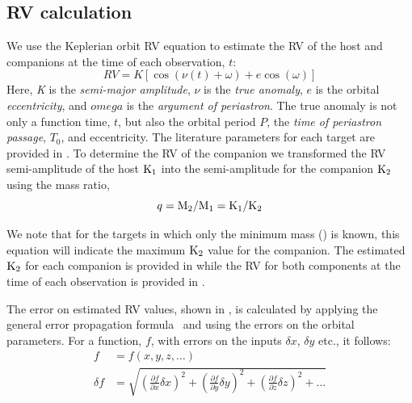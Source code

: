 \subsection{{RV} calculation}
We use the Keplerian orbit {RV} equation to estimate the {RV} of the host and companions at the time of each observation, \(t\):
\begin{equation}
\label{eq:rv_equation}
{RV} = K [\cos{(\nu(t) + \omega)} + e\cos{(\omega)}]
\end{equation}
Here, \emph{K} is the \emph{semi-major amplitude}, \(\nu\) is the \emph{true anomaly}, \(e\) is the orbital \emph{eccentricity}, and \(omega\) is the \emph{argument of periastron}.
The true anomaly is not only a function time, \(t\), but also the orbital period \(P\), the \emph{time of periastron passage}, \(T_0\), and eccentricity.
The literature parameters for each target are provided in .
To determine the {RV} of the companion we transformed the {RV} semi-amplitude of the host \(\textrm{K}_{1}\) into the semi-amplitude for the companion \(\textrm{K}_{2}\) using the mass ratio,
\begin{equation}
\label{eqn:mass_ratio}
q = \textrm{M}_{2} / \textrm{M}_{1} = \textrm{K}_{1} / \textrm{K}_{2}
\end{equation}

We note that for the targets in which only the minimum mass (\mtwosini) is known, this equation will indicate the maximum \(\textrm{K}_{2}\) value for the companion. The estimated \(\textrm{K}_{2}\) for each companion is provided in  while the {RV} for both components at the time of each observation is provided in .


The error on estimated {RV} values, shown in , is calculated by applying the general error propagation formula~\citep{ku_notes_1966} and using the errors on the orbital parameters. For a function, \(f\), with errors on the inputs \(\delta x\), \(\delta y\) etc., it follows:
\begin{align}
f &= f(x, y, z, \ldots)\\
\delta f &= \sqrt{{\left( \frac{\partial f}{\partial x} \delta x\right)}^2 + {\left(\frac{\partial f}{\partial y} \delta y\right)}^2 + {\left(\frac{\partial f}{\partial z} \delta z\right)}^2 + \ldots}
\end{align}




